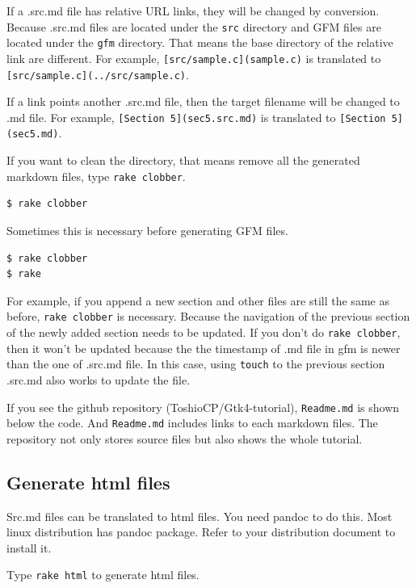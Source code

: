 If a .src.md file has relative URL links, they will be changed by
conversion. Because .src.md files are located under the \texttt{src}
directory and GFM files are located under the \texttt{gfm} directory.
That means the base directory of the relative link are different. For
example, \texttt{{[}src/sample.c{]}(sample.c)} is translated to
\texttt{{[}src/sample.c{]}(../src/sample.c)}.

If a link points another .src.md file, then the target filename will be
changed to .md file. For example, \texttt{{[}Section\ 5{]}(sec5.src.md)}
is translated to \texttt{{[}Section\ 5{]}(sec5.md)}.

If you want to clean the directory, that means remove all the generated
markdown files, type \texttt{rake\ clobber}.

\begin{verbatim}
$ rake clobber
\end{verbatim}

Sometimes this is necessary before generating GFM files.

\begin{verbatim}
$ rake clobber
$ rake
\end{verbatim}

For example, if you append a new section and other files are still the
same as before, \texttt{rake\ clobber} is necessary. Because the
navigation of the previous section of the newly added section needs to
be updated. If you don't do \texttt{rake\ clobber}, then it won't be
updated because the the timestamp of .md file in gfm is newer than the
one of .src.md file. In this case, using \texttt{touch} to the previous
section .src.md also works to update the file.

If you see the github repository (ToshioCP/Gtk4-tutorial),
\texttt{Readme.md} is shown below the code. And \texttt{Readme.md}
includes links to each markdown files. The repository not only stores
source files but also shows the whole tutorial.

\hypertarget{generate-html-files}{%
\subsection{Generate html files}\label{generate-html-files}}

Src.md files can be translated to html files. You need pandoc to do
this. Most linux distribution has pandoc package. Refer to your
distribution document to install it.

Type \texttt{rake\ html} to generate html files.


